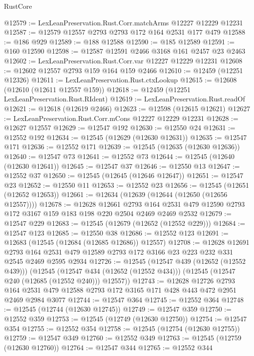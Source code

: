 \begin{lexlean}{RustCore}
\begin{coremodule}
@12579 := LexLeanPreservation.Rust.Corr.matchArms @12227 @12229 @12231
@12587 := @12579 @12557 @2793 @2793 @172 @164 @2531 @177 @479
@12588 := @186 @929
@12589 := @188 @12588
@12590 := @185 @12589
@12591 := @160 @12590
@12598 := @12587 @12591 @2466 @3168 @161 @2457 @23 @2463
@12602 := LexLeanPreservation.Rust.Corr.var @12227 @12229 @12231
@12608 := @12602 @12557 @2793 @159 @164 @159 @2466
@12610 := @12459 (@12251 @12326)
@12611 := LexLeanPreservation.Rust.ctxLookup
@12615 := @12608 (@12610 (@12611 @12557 @159))
@12618 := @12459 (@12251 LexLeanPreservation.Rust.RIdent)
@12619 := LexLeanPreservation.Rust.readOf
@12621 := @12618 (@12619 @2466)
@12623 := @12598 (@12615 @12621)
@12627 := LexLeanPreservation.Rust.Corr.mCons @12227 @12229 @12231
@12628 := @12627 @12557
@12629 := @12547 @192
@12630 := @12550 @24
@12631 := @12552 @192
@12634 := @12545 (@12629 (@12630 @12631))
@12635 := @12547 @171
@12636 := @12552 @171
@12639 := @12545 (@12635 (@12630 @12636))
@12640 := @12547 @73
@12641 := @12552 @73
@12644 := @12545 (@12640 (@12630 @12641))
@12645 := @12547 @37
@12646 := @12550 @13
@12647 := @12552 @37
@12650 := @12545 (@12645 (@12646 @12647))
@12651 := @12547 @23
@12652 := @12550 @11
@12653 := @12552 @23
@12656 := @12545 (@12651 (@12652 @12653))
@12661 := @12634 (@12639 (@12644 (@12650 (@12656 @12557))))
@12678 := @12628
    @12661
    @2793
    @164
    @2531
    @479
    @12590
    @2793
    @172
    @3167
    @159
    @183
    @198
    @220
    @2504
    @2469
    @2469
    @2532
@12679 := @12547 @229
@12683 := @12545 (@12679 (@12652 (@12552 @229)))
@12684 := @12547 @123
@12685 := @12550 @38
@12686 := @12552 @123
@12691 := @12683 (@12545 (@12684 (@12685 @12686)) @12557)
@12708 := @12628
    @12691
    @2793
    @164
    @2531
    @479
    @12589
    @2793
    @172
    @3166
    @23
    @223
    @232
    @331
    @2545
    @2469
    @2595
    @2934
@12726 := @12545
    (@12547 @439 (@12652 (@12552 @439)))
    (@12545
      (@12547 @434 (@12652 (@12552 @434)))
      (@12545 (@12547 @240 (@12685 (@12552 @240))) @12557))
@12743 := @12628
    @12726
    @2793
    @164
    @2531
    @479
    @12588
    @2793
    @172
    @3165
    @171
    @428
    @443
    @472
    @2951
    @2469
    @2984
    @3077
@12744 := @12547 @364
@12745 := @12552 @364
@12748 := @12545 (@12744 (@12630 @12745))
@12749 := @12547 @359
@12750 := @12552 @359
@12753 := @12545 (@12749 (@12630 @12750))
@12754 := @12547 @354
@12755 := @12552 @354
@12758 := @12545 (@12754 (@12630 @12755))
@12759 := @12547 @349
@12760 := @12552 @349
@12763 := @12545 (@12759 (@12630 @12760))
@12764 := @12547 @344
@12765 := @12552 @344

\end{coremodule}
\end{lexlean}
